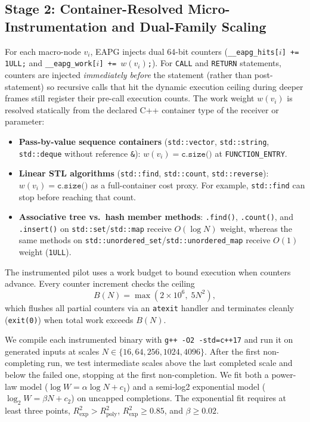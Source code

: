 \documentclass[10pt,conference]{IEEEtran}
\begin{document}
\subsection{Stage 2: Container-Resolved Micro-Instrumentation and Dual-Family Scaling}
For each macro-node $v_i$, EAPG injects dual 64-bit counters (\texttt{\_\_eapg\_hits[$i$] += 1ULL;} and \texttt{\_\_eapg\_work[$i$] += $w(v_i)$;}). For \texttt{CALL} and \texttt{RETURN} statements, counters are injected \emph{immediately before} the statement (rather than post-statement) so recursive calls that hit the dynamic execution ceiling during deeper frames still register their pre-call execution counts. The work weight $w(v_i)$ is resolved statically from the declared C++ container type of the receiver or parameter:
\begin{itemize}
    \item \textbf{Pass-by-value sequence containers} (\texttt{std::vector}, \texttt{std::string}, \texttt{std::deque} without reference \texttt{\&}): $w(v_i) = \texttt{c.size()}$ at \texttt{FUNCTION\_ENTRY}.
    \item \textbf{Linear STL algorithms} (\texttt{std::find}, \texttt{std::count}, \texttt{std::reverse}): $w(v_i) = \texttt{c.size()}$ as a full-container cost proxy. For example, \texttt{std::find} can stop before reaching that count.
    \item \textbf{Associative tree vs.\ hash member methods}: \texttt{.find()}, \texttt{.count()}, and \texttt{.insert()} on \texttt{std::set}/\texttt{std::map} receive $O(\log N)$ weight, whereas the same methods on \texttt{std::unordered\_set}/\texttt{std::unordered\_map} receive $O(1)$ weight (\texttt{1ULL}).
\end{itemize}
The instrumented pilot uses a work budget to bound execution when counters advance. Every counter increment checks the ceiling
\begin{equation}
B(N) = \max\!\left(2 \times 10^6,\; 5N^2\right),
\end{equation}
which flushes all partial counters via an \texttt{atexit} handler and terminates cleanly (\texttt{exit(0)}) when total work exceeds $B(N)$.

We compile each instrumented binary with \texttt{g++ -O2 -std=c++17} and run it on generated inputs at scales $N \in \{16,64,256,1024,4096\}$. After the first non-completing run, we test intermediate scales above the last completed scale and below the failed one, stopping at the first non-completion. We fit both a power-law model ($\log W = \alpha \log N + c_1$) and a semi-log2 exponential model ($\log_2 W = \beta N + c_2$) on uncapped completions. The exponential fit requires at least three points, $R^2_{\text{exp}} > R^2_{\text{poly}}$, $R^2_{\text{exp}} \ge 0.85$, and $\beta \ge 0.02$.
\end{document}
